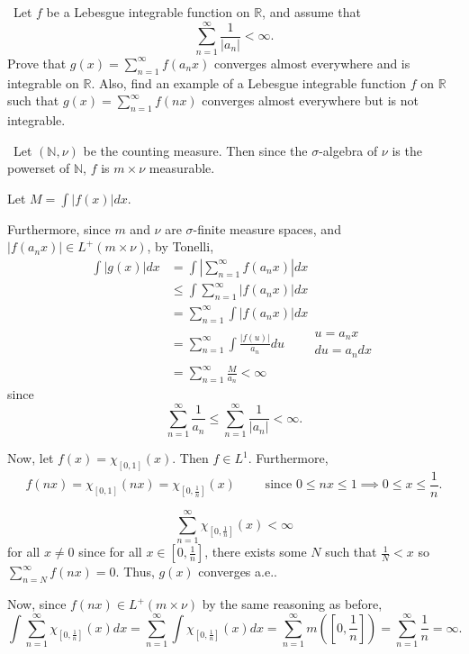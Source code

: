 \documentclass[12pt]{Qual}
\begin{document}
\begin{problem} $\,$
Let $f$ be a Lebesgue integrable function on $\mathbb{R}$, and assume that $$\sum_{n=1}^\infty\frac{1}{|a_n|}<\infty.$$
Prove that $g(x)=\sum_{n=1}^\infty f(a_nx)$ converges almost everywhere and is integrable on $\mathbb{R}$. Also, find an example of a Lebesgue integrable function $f$ on $\mathbb{R}$ such that $g(x)=\sum_{n=1}^\infty f(nx)$ converges almost everywhere but is not integrable.
\end{problem}


\begin{solution}$\,$
Let $(\mathbb{N},\nu)$ be the counting measure. Then since the $\sigma$-algebra of $\nu$ is the powerset of $\mathbb{N}$, $f$ is $m\times\nu$ measurable.

Let $M=\int|f(x)|dx.$

Furthermore, since $m$ and $\nu$ are $\sigma$-finite measure spaces, and $|f(a_nx)|\in L^+(m\times\nu)$, by Tonelli, \begin{align*}
    \int|g(x)|dx&=\int\left|\sum_{n=1}^\infty f(a_nx)\right|dx\\
    &\le\int\sum_{n=1}^\infty|f(a_nx)|dx\\
    &=\sum_{n=1}^\infty\int|f(a_nx)|dx\\
    &=\sum_{n=1}^\infty\int\frac{|f(u)|}{a_n}du\qquad \begin{matrix}
    u=a_nx   \\
    du=a_ndx
\end{matrix}\\
&=\sum_{n=1}^\infty\frac{M}{a_n}<\infty
\end{align*}since $$\sum_{n=1}^\infty \frac{1}{a_n}\le\sum_{n=1}^\infty \frac{1}{|a_n|}<\infty.$$

Now, let $f(x)=\chi_{[0,1]}(x)$. Then $f\in L^1$. Furthermore, $$f(nx)=\chi_{[0,1]}(nx)=\chi_{[0,\frac{1}{n}]}(x)\qquad\text{ since }0\le nx\le 1\implies 0\le x\le\frac{1}{n}.$$

$$\sum_{n=1}^\infty\chi_{[0,\frac{1}{n}]}(x)<\infty$$ for all $x\not=0$ since for all $x\in[0,\frac{1}{n}]$, there exists some $N$ such that $\frac{1}{N}<x$ so $\sum_{n=N}^\infty f(nx)=0$. Thus, $g(x)$ converges a.e..

Now, since $f(nx)\in L^+(m\times\nu)$ by the same reasoning as before, $$\int\sum_{n=1}^\infty \chi_{[0,\frac{1}{n}]}(x)dx=\sum_{n=1}^\infty\int\chi_{[0,\frac{1}{n}]}(x)dx=\sum_{n=1}^\infty m([0,\frac{1}{n}])=\sum_{n=1}^\infty\frac{1}{n}=\infty.$$
\end{solution}
\newpage
\end{document}
